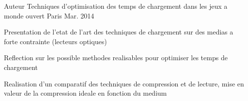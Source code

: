 

\begin{cventries}

  \cventry
    {Auteur} %
    {Techniques d'optimisation des temps de chargement dans les jeux a monde ouvert } %
    {Paris} %
    {Mar. 2014} %
    {
      \begin{cvitems} %
        \item {Presentation de l'etat de l'art des techniques de chargement sur des medias a forte contrainte (lecteurs optiques)}
        \item {Reflection sur les possible methodes realisables pour optimiser les temps de chargement}
        \item {Realisation d'un comparatif des techniques de compression et de lecture, mise en valeur de la compression ideale en fonction du medium}
      \end{cvitems}
    }


\end{cventries}
